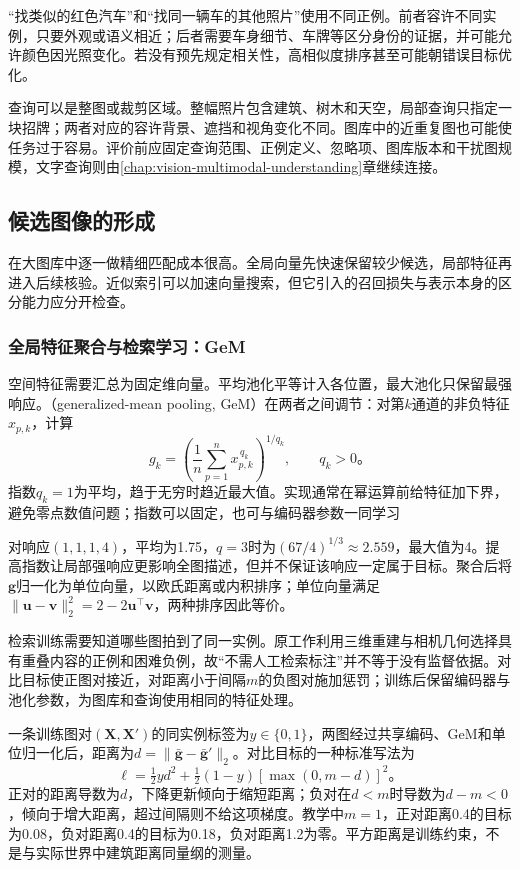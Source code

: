 “找类似的红色汽车”和“找同一辆车的其他照片”使用不同正例。前者容许不同实例，只要外观或语义相近；后者需要车身细节、车牌等区分身份的证据，并可能允许颜色因光照变化。若没有预先规定相关性，高相似度排序甚至可能朝错误目标优化。

查询可以是整图或裁剪区域。整幅照片包含建筑、树木和天空，局部查询只指定一块招牌；两者对应的容许背景、遮挡和视角变化不同。图库中的近重复图也可能使任务过于容易。评价前应固定查询范围、正例定义、忽略项、图库版本和干扰图规模，文字查询则由\ref{chap:vision-multimodal-understanding}章继续连接。

\subsection{候选图像的形成}
\label{sec:vision-recognition-candidates}

在大图库中逐一做精细匹配成本很高。全局向量先快速保留较少候选，局部特征再进入后续核验。近似索引可以加速向量搜索，但它引入的召回损失与表示本身的区分能力应分开检查。

\subsubsection{全局特征聚合与检索学习：GeM}
\label{sec:vision-recognition-gem}

空间特征需要汇总为固定维向量。平均池化平等计入各位置，最大池化只保留最强响应。（generalized-mean pooling, GeM）在两者之间调节：对第$k$通道的非负特征$x_{p,k}$，计算
\begin{equation}
 g_k=\left(\frac1n\sum_{p=1}^{n}x_{p,k}^{\,q_k}\right)^{1/q_k},
 \qquad q_k>0\text{。}
 \label{eq:vision-gem}
\end{equation}
指数$q_k=1$为平均，趋于无穷时趋近最大值。实现通常在幂运算前给特征加下界，避免零点数值问题；指数可以固定，也可与编码器参数一同学习

对响应$(1,1,1,4)$，平均为1.75，$q=3$时为$(67/4)^{1/3}\approx2.559$，最大值为4。提高指数让局部强响应更影响全图描述，但并不保证该响应一定属于目标。聚合后将$\bm{g}$归一化为单位向量，以欧氏距离或内积排序；单位向量满足$\lVert\bm{u}-\bm{v}\rVert_2^2=2-2\bm{u}^{\top}\bm{v}$，两种排序因此等价。

检索训练需要知道哪些图拍到了同一实例。原工作利用三维重建与相机几何选择具有重叠内容的正例和困难负例，故“不需人工检索标注”并不等于没有监督依据。对比目标使正图对接近，对距离小于间隔$m$的负图对施加惩罚；训练后保留编码器与池化参数，为图库和查询使用相同的特征处理。

一条训练图对$(\bm X,\bm X')$的同实例标签为$y\in\{0,1\}$，两图经过共享编码、GeM和单位归一化后，距离为$d=\lVert\bar{\bm g}-\bar{\bm g}'\rVert_2$。对比目标的一种标准写法为
\begin{equation}
 \ell=\tfrac12 y d^2+
 \tfrac12(1-y)[\max(0,m-d)]^2\text{。}
 \label{eq:vision-gem-contrastive-process}
\end{equation}
正对的距离导数为$d$，下降更新倾向于缩短距离；负对在$d<m$时导数为$d-m<0$，倾向于增大距离，超过间隔则不给这项梯度。教学中$m=1$，正对距离0.4的目标为0.08，负对距离0.4的目标为0.18，负对距离1.2为零。平方距离是训练约束，不是与实际世界中建筑距离同量纲的测量。

